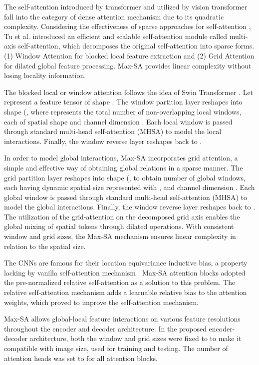 \documentclass{article}
\begin{document}
The self-attention introduced by transformer \cite{vaswani2017attention} and utilized by vision transformer \cite{dosovitskiy2021an} fall into the category of dense attention mechanism due to its quadratic complexity. Considering the effectiveness of sparse approaches for self-attention \cite{tu2022maxim,zhao2021improved}, Tu et al. \cite{tu2022maxvit} introduced an efficient and scalable self-attention module called multi-axis self-attention, which decomposes the original self-attention into sparse forms. (1) Window Attention for blocked local feature extraction and (2) Grid Attention for dilated global feature processing. Max-SA provides linear complexity without losing locality information.

The blocked local or window attention follows the idea of Swin Transformer \cite{cao2022swin}. Let  represent a feature tensor of shape . The window partition layer reshapes  into shape  (, where  represents the total number of non-overlapping local windows, each of spatial shape  and channel dimension . Each local window is passed through standard multi-head self-attention (MHSA) to model the local interactions. Finally, the window reverse layer reshapes  back to .

In order to model global interactions, Max-SA incorporates grid attention, a simple and effective way of obtaining global relations in a sparse manner. The grid partition layer reshapes  into shape (, to obtain  number of global windows, each having dynamic spatial size represented with , and channel dimension . Each global window is passed through standard multi-head self-attention (MHSA) to model the global interactions. Finally, the window reverse layer reshapes  back to . The utilization of the grid-attention on the decomposed grid axis enables the global mixing of spatial tokens through dilated operations. With consistent window and grid sizes, the Max-SA mechanism ensures linear complexity in relation to the spatial size.

The CNNs are famous for their location equivariance inductive bias, a property lacking by vanilla self-attention mechanism \cite{dosovitskiy2021an,han2021transformer}. Max-SA attention blocks adopted the pre-normalized relative self-attention \cite{dai2021coatnet} as a solution to this problem. The relative self-attention mechanism \cite{dai2021coatnet,shaw2018self,jiang2021transgan,cao2022swin} adds a learnable relative bias to the attention weights, which proved to improve the self-attention mechanism.

Max-SA allows global-local feature interactions on various feature resolutions throughout the encoder and decoder architecture. In the proposed encoder-decoder architecture, both the window and grid sizes were fixed to  to make it compatible with  image size, used for training and testing. The number of attention heads was set to  for all attention blocks.
\end{document}
